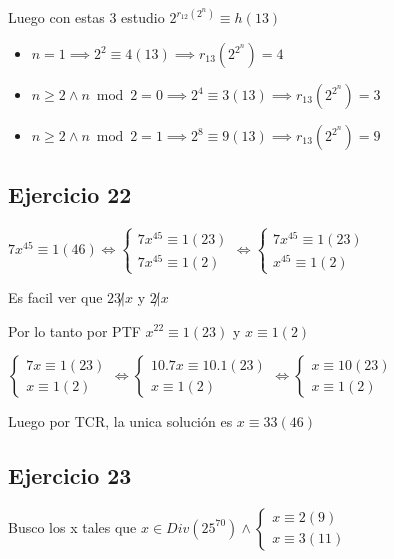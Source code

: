 Luego con estas 3 estudio $ 2^{r_{12}(2^n)} \equiv h(13) $

\begin{itemize}
    \item $ n = 1 \implies 2^2 \equiv 4(13) \implies r_{13}(2^{2^n}) = 4 $
    \item $ n \geq 2 \wedge n \bmod 2 = 0 \implies 2^4 \equiv 3(13) \implies r_{13}(2^{2^n}) = 3 $
    \item $ n \geq 2 \wedge n \bmod 2 = 1 \implies 2^8 \equiv 9(13) \implies r_{13}(2^{2^n}) = 9 $
\end{itemize}

\subsection{Ejercicio 22}

$ 7x^{45} \equiv 1(46) \iff \begin{cases}
    7x^{45} \equiv 1(23) \\
    7x^{45} \equiv 1(2)
\end{cases} 
\iff \begin{cases}
    7x^{45} \equiv 1(23) \\
    x^{45} \equiv 1(2)
\end{cases} $

Es facil ver que $ 23\not | x $ y $ 2\not | x $

Por lo tanto por PTF $ x^{22} \equiv 1(23) $ y $ x \equiv 1(2) $

$ \begin{cases}
    7x \equiv 1(23) \\
    x \equiv 1(2)
\end{cases} 
\iff \begin{cases}
    10.7x \equiv 10.1(23) \\
    x \equiv 1(2)
\end{cases}
\iff \begin{cases}
    x \equiv 10(23) \\
    x \equiv 1(2)
\end{cases} $

Luego por TCR, la unica solución es $ x \equiv 33(46) $

\subsection{Ejercicio 23}

Busco los x tales que $ x \in Div(25^{70}) \wedge \begin{cases}
    x \equiv 2(9) \\
    x \equiv 3(11)
\end{cases} $

